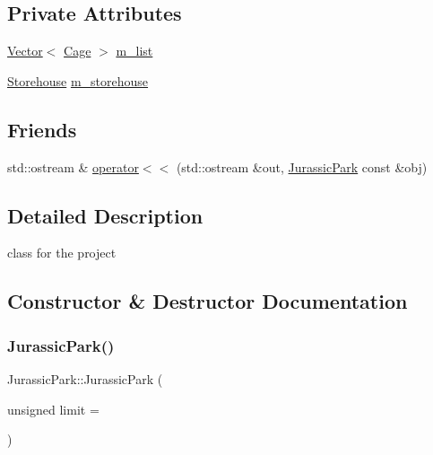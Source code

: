 \subsection*{Private Attributes}
\begin{DoxyCompactItemize}
\item 
\hyperlink{classVector}{Vector}$<$ \hyperlink{classCage}{Cage} $>$ \hyperlink{classJurassicPark_aff664f70b0ab4d0287107b83f1c5e89a}{m\+\_\+list}
\item 
\hyperlink{classStorehouse}{Storehouse} \hyperlink{classJurassicPark_af0c4958aa71443927e7fcb9e5da545d3}{m\+\_\+storehouse}
\end{DoxyCompactItemize}
\subsection*{Friends}
\begin{DoxyCompactItemize}
\item 
std\+::ostream \& \hyperlink{classJurassicPark_a6f52feef02787591567009e3e5d18bd9}{operator$<$$<$} (std\+::ostream \&out, \hyperlink{classJurassicPark}{Jurassic\+Park} const \&obj)
\end{DoxyCompactItemize}


\subsection{Detailed Description}
class for the project 

\subsection{Constructor \& Destructor Documentation}
\mbox{\label{classJurassicPark_afe445635eccef6d51146e3cc519644ef}} 
\subsubsection{\texorpdfstring{Jurassic\+Park()}{JurassicPark()}\hspace{0.1cm}{\footnotesize\ttfamily [1/2]}}
{\footnotesize\ttfamily Jurassic\+Park\+::\+Jurassic\+Park (\begin{DoxyParamCaption}\item[{unsigned}]{limit = {} }\end{DoxyParamCaption})\hspace{0.3cm}{\ttfamily [private]}}



